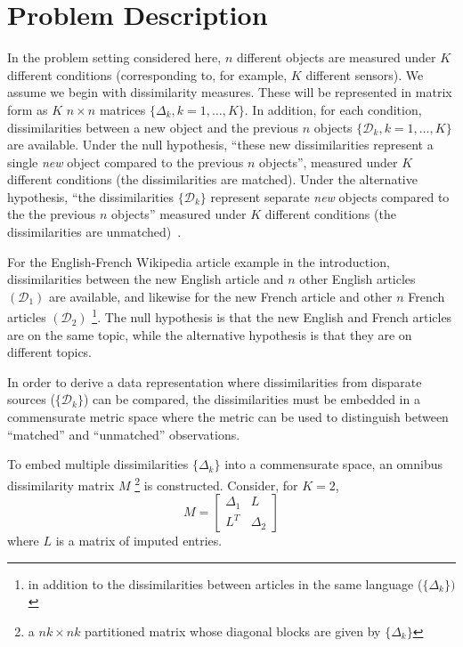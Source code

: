\documentclass[12pt]{article} %
\begin{document}
\section{Problem Description}
In the problem setting considered here,  $n$ different objects are measured under $K$ different conditions (corresponding  to, for example, $K$ different sensors). We assume we begin with dissimilarity measures. These will be represented in matrix form as $K$ $n \times n$ matrices $\{\Delta_k,k=1 ,\ldots,K\}$.  In addition, for each condition, dissimilarities between  a new object  and the previous 
$n$ objects $\{\mathcal{D}_k,k=1 ,\ldots,K\}$ are available. Under  the null hypothesis, ``these new dissimilarities represent a single \emph{new} object  compared to the previous $n$ objects'', measured under $K$ different conditions (the dissimilarities are matched). Under the alternative hypothesis, ``the dissimilarities $\{\mathcal{D}_k\}$ represent separate \emph{new} objects compared to the the previous $n$ objects''  measured under $K$ different conditions (the dissimilarities are unmatched)~\cite{JOFC}. %

For the English-French Wikipedia  article example in the introduction,  dissimilarities between the new English article and $n$ other English articles $(\mathcal{D}_1)$ are available, and likewise for the new French article  and other $n$ French articles $(\mathcal{D}_2)$ \footnote{in addition to the dissimilarities between articles in the same language  ($\{\Delta_k\})$ }. The null hypothesis is that the new English and French articles are on the same topic, while the alternative hypothesis is that they are on different topics.

  In order to derive a data representation where dissimilarities from disparate sources ($\{\mathcal{D}_k\}$)  can be compared, the dissimilarities must be embedded in a commensurate metric space where the metric can be used to distinguish between ``matched'' and ``unmatched'' observations.


To embed multiple dissimilarities  $\{\Delta_k\}$  into a commensurate space, an omnibus dissimilarity matrix  $M$ \footnote{a $nk \times nk$ partitioned matrix whose diagonal blocks are given by $\{\Delta_k\}$ }  is constructed. Consider, for $K=2$,
 \begin{equation}
M=  \left[ \begin{array}{cc}
         \Delta_1 & L\\
        L^T  & \Delta_2 
     \end{array}  \right]     \label{omnibus} 
\end{equation} where $L$ is a matrix of imputed entries. 
\end{document}
